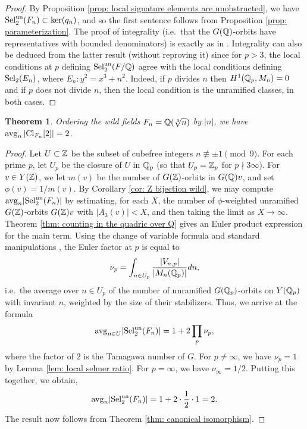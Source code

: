 \documentclass[11pt,a4paper]{amsart}
\def\Z{{\rm \mathbb{Z}}}
\def\Q{{\rm \mathbb{Q}}}
\def\un{{\rm un}}
\def\avg{{\rm avg}}
\def\Cl{{\rm Cl}}
\def\Sel{{\rm Sel}}
\numberwithin{equation}{section}
\newtheorem{theorem}{Theorem}[section]
\begin{document}
\begin{proof}
    By Proposition \ref{prop: local signature elements are unobstructed}, we have $\Sel_2^\un(F_n) \subset \ker(q_n)$, and so the first sentence follows from Proposition \ref{prop: parameterization}.  The proof of integrality (i.e.\ that the $G(\Q)$-orbits have representatives with bounded denominators) is exactly as in \cite[Theorem 3.19]{AlpogeBhargavaShnidman}. Integrality can also be deduced from the latter result (without reproving it) since for $p > 3$, the local conditions at $p$ defining $\Sel_2^\un(F/\Q)$ agree with the local conditions defining $\Sel_2(E_n)$, where $E_n \colon y^2 = x^3 + n^2$. Indeed, if $p$ divides $n$ then $H^1(\Q_p, M_n) = 0$ and if $p$ does not divide $n$, then the local condition is the unramified classes, in both cases.  
\end{proof}

\begin{theorem}\label{thm: wild selmer avg}
    Ordering the wild fields $F_n = \Q(\sqrt[3]{n})$ by $|n|$, we have $\avg_n\, |\Cl_{F_n}[2]| = 2$.
\end{theorem}

\begin{proof}
 Let $U \subset \Z$ be the subset of cubefree integers $n \not\equiv \pm 1 \pmod{9}$. For each prime $p$, let $U_p$ be the closure of $U$ in $\Q_p$ (so that $U_p = \Z_p$ for $p \nmid 3\infty$). For $v \in Y(\Z)$, we let $m(v)$ be the number of $G(\Z)$-orbits in $G(\Q)v$, and set $\phi(v) = 1/m(v)$.  By Corollary \ref{cor: Z bijection wild}, we may compute $\avg_n|\Sel_2^\un(F_n)|$ by estimating, for each $X$, the number of $\phi$-weighted unramified $G(\Z)$-orbits $G(\Z)v$ with $|A_3(v)| < X$, and then taking the limit as $X \to \infty$.   Theorem \ref{thm: counting in the quadric over Q} gives an Euler product expression for the main term. Using the change of variable formula \cite[Proposition 4.10]{AlpogeBhargavaShnidman} and standard manipulations \cite[proof of Theorem 5.3]{AlpogeBhargavaShnidman}, the Euler factor at $p$ is equal to 
 \[\nu_p = \int_{n \in U_p} \frac{|V_{n,p}|}{|M_n(\Q_p)|}dn,\]
i.e.\ the average over $n \in U_p$ of the number of unramified $G(\Q_p)$-orbits on $Y(\Q_p)$ with invariant $n$, weighted by the size of their stabilizers. 
Thus, we arrive at the formula
\[\avg_{n \in U} |\Sel_2^\un(F_n)| = 1 + 2\prod_p \nu_p,\] 
where the factor of $2$ is the Tamagawa number of $G$. For $p \neq \infty$, we have $\nu_p  = 1$ by Lemma \ref{lem: local selmer ratio}. For $p = \infty$, we have $\nu_\infty = 1/2$.  Putting this together, we obtain,
\[\avg_n |\Sel_2^\un(F_n)| =1 + 2\cdot \frac12 \cdot 1 =  2.\]
The result now follows from Theorem \ref{thm: canonical isomorphism}.
\end{proof}
\end{document}
